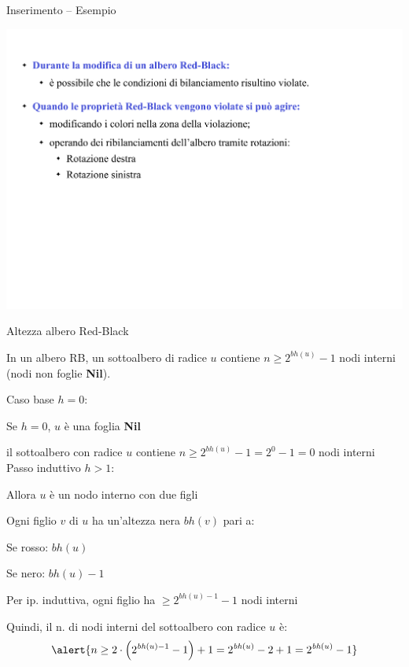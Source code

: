 \begin{frame}{Inserimento -- Esempio}

\includegraphics[width=1.0\textwidth,page=33]{redblack2.pdf}

\end{frame}


\begin{frame}{Altezza albero Red-Black}

\vspace{-9pt}
\begin{myboxtitle}[Teorema]
In un albero RB, un sottoalbero di radice $u$ contiene 
\alert{$n \geq 2^{\mathit{bh}(u)}-1$} nodi interni (nodi non foglie \textbf{Nil}).
\end{myboxtitle}

\begin{myboxtitle}[Dimostrazione]
\begin{overprint}
\alert{Caso base $h=0$}:
\BI
\item Se $h=0$, $u$ è una foglia {\bf Nil}
\item il sottoalbero con radice $u$ contiene 
\alert{$n \geq 2^{\mathit{bh}(u)}-1 = 2^0-1 = 0$} nodi interni
\EI
{}
\alert{Passo induttivo $h>1$}: 
\BI
\item Allora $u$ è un nodo interno con due figli
\item Ogni figlio $v$ di $u$ ha un'altezza nera $\mathit{bh}(v)$ pari a:
  \BI 
  \item Se rosso: $\mathit{bh}(u)$
  \item Se nero: \alert{$\mathit{bh}(u)-1$} 
  \EI
\item Per ip. induttiva, ogni figlio ha $\geq 2^{\mathit{bh}(u)-1}-1$ nodi interni 
\item Quindi, il n. di nodi interni del sottoalbero con radice $u$ è:
\[
  \alert{n \geq 2 \cdot \left(2^{\mathit{bh}(u)-1}-1\right) +1 = 2^{\mathit{bh}(u)} -2 +1 = 2^{\mathit{bh}(u)} -1 }
\]
\EI
\end{overprint}
\end{myboxtitle}


\end{frame}

